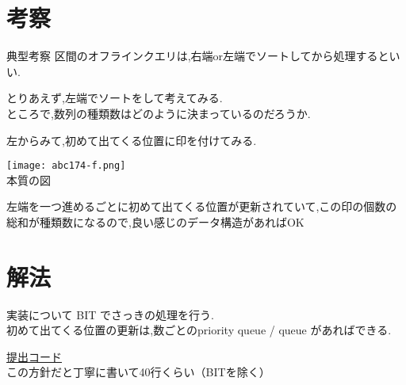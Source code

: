 \documentclass[dvipdfmx,12pt]{beamer}%
\begin{document}
\section{考察}

\begin{frame}
\begin{block}{典型考察}
区間のオフラインクエリは,右端or左端でソートしてから処理するといい.
\end{block}
とりあえず,左端でソートをして考えてみる.\\
ところで,数列の種類数はどのように決まっているのだろうか.
\end{frame}

\begin{frame}
左からみて,初めて出てくる位置に印を付けてみる.\\
\begin{center}
\texttt{[image: abc174-f.png]} \\
本質の図
\end{center}
左端を一つ進めるごとに初めて出てくる位置が更新されていて,この印の個数の総和が種類数になるので,良い感じのデータ構造があればOK
\end{frame}

\section{解法}
\begin{frame}
\begin{block}{実装について}
BIT でさっきの処理を行う.\\
初めて出てくる位置の更新は,数ごとのpriority queue / queue があればできる.
\end{block}

\href{https://atcoder.jp/contests/abc174/submissions/15722462}{提出コード}\\
この方針だと丁寧に書いて40行くらい（BITを除く）
\end{frame}
\end{document}
